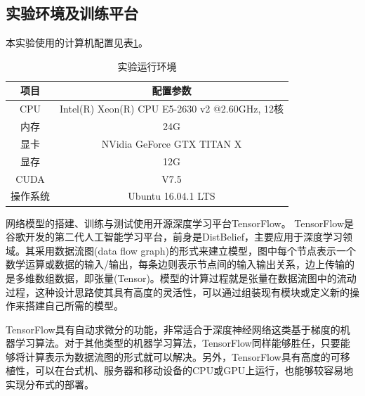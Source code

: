\subsection{实验环境及训练平台}
本实验使用的计算机配置见表\ref{tab:3_3_experiment_environment}。
\begin{table}[htbp]
	\centering
	\caption{实验运行环境} \label{tab:3_3_experiment_environment}
	\begin{small} %
		\begin{tabular*}{\textwidth}{@{\extracolsep{\fill}}cc} \toprule[2pt]
			项目  & 配置参数  \\ \midrule[1pt]
			CPU & Intel(R) Xeon(R) CPU E5-2630 v2 @2.60GHz, 12核 \\
			内存 & 24G \\
			显卡 & NVidia GeForce GTX TITAN X \\
			显存 & 12G \\
			CUDA & V7.5 \\
			操作系统 & Ubuntu 16.04.1 LTS \\ \bottomrule[2pt]
		\end{tabular*}
	\end{small} %
\end{table}

网络模型的搭建、训练与测试使用开源深度学习平台TensorFlow\cite{abadi2016tensorflow}。
TensorFlow是谷歌开发的第二代人工智能学习平台，前身是DistBelief，主要应用于深度学习领域。其采用数据流图(data flow graph)的形式来建立模型，图中每个节点表示一个数学运算或数据的输入/输出，每条边则表示节点间的输入输出关系，边上传输的是多维数组数据，即张量(Tensor)。模型的计算过程就是张量在数据流图中的流动过程，这种设计思路使其具有高度的灵活性，可以通过组装现有模块或定义新的操作来搭建自己所需的模型。

TensorFlow具有自动求微分的功能，非常适合于深度神经网络这类基于梯度的机器学习算法。对于其他类型的机器学习算法，TensorFlow同样能够胜任，只要能够将计算表示为数据流图的形式就可以解决。另外，TensorFlow具有高度的可移植性，可以在台式机、服务器和移动设备的CPU或GPU上运行，也能够较容易地实现分布式的部署。

